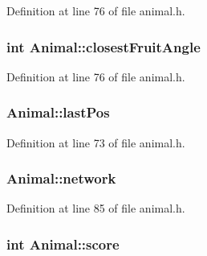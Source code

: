 Definition at line 76 of file animal.\-h.

\hypertarget{class_animal_a587480ed32eadd3b7590e880f05d5e4d}{
\subsubsection[{closest\-Fruit\-Angle}]{\setlength{\rightskip}{0pt plus 5cm}int Animal\-::closest\-Fruit\-Angle\hspace{0.3cm}{\ttfamily [protected]}}}\label{class_animal_a587480ed32eadd3b7590e880f05d5e4d}


Definition at line 76 of file animal.\-h.

\hypertarget{class_animal_a803f0b218477a5e365c1dde6128fb53e}{
\subsubsection[{last\-Pos}]{ Animal\-::last\-Pos\hspace{0.3cm}{\ttfamily [protected]}}}\label{class_animal_a803f0b218477a5e365c1dde6128fb53e}


Definition at line 73 of file animal.\-h.

\hypertarget{class_animal_a61e897a85af66b3b8315e313ed86a307}{
\subsubsection[{network}]{ Animal\-::network\hspace{0.3cm}{\ttfamily [protected]}}}\label{class_animal_a61e897a85af66b3b8315e313ed86a307}


Definition at line 85 of file animal.\-h.

\hypertarget{class_animal_ab5ab9a2e34464e0415b6588e820b0ad7}{
\subsubsection[{score}]{\setlength{\rightskip}{0pt plus 5cm}int Animal\-::score\hspace{0.3cm}{\ttfamily [protected]}}}\label{class_animal_ab5ab9a2e34464e0415b6588e820b0ad7}


